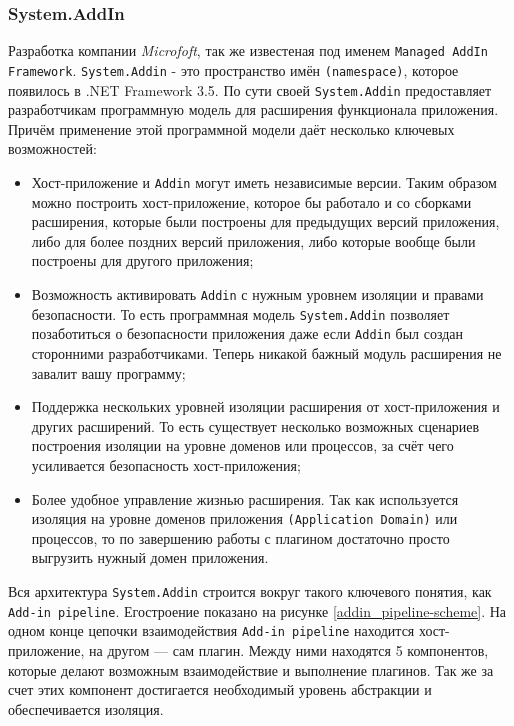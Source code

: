 \subsubsection{System.AddIn}

Разработка компании {\it Microfoft}, так же известеная под именем {\tt Managed AddIn Framework}. {\tt System.Addin} - это пространство имён {\tt(namespace)}, которое появилось в .NET Framework 3.5. По сути своей {\tt System.Addin} предоставляет разработчикам программную модель для расширения функционала приложения. Причём применение этой программной модели даёт несколько ключевых возможностей:

\begin{itemize}

  \item Хост-приложение и {\tt Addin} могут иметь независимые версии. Таким образом можно построить хост-приложение, которое бы работало и со сборками расширения, которые были построены для предыдущих версий приложения, либо для более поздних версий приложения, либо которые вообще были построены для другого приложения;

  \item Возможность активировать {\tt Addin} с нужным уровнем изоляции и правами безопасности. То есть программная модель {\tt System.Addin} позволяет позаботиться о безопасности приложения даже если {\tt Addin} был создан сторонними разработчиками. Теперь никакой бажный модуль расширения не завалит вашу программу;

  \item Поддержка нескольких уровней изоляции расширения от хост-приложения и других расширений. То есть существует несколько возможных сценариев построения изоляции на уровне доменов или процессов, за счёт чего усиливается безопасность хост-приложения;

  \item Более удобное управление жизнью расширения. Так как используется изоляция на уровне доменов приложения {\tt (Application Domain)} или процессов, то по завершению работы с плагином достаточно просто выгрузить нужный домен приложения.

\end{itemize}

Вся архитектура {\tt System.Addin} строится вокруг такого ключевого понятия, как {\tt Add-in pipeline}. Егостроение показано на рисунке \ref{addin_pipeline-scheme}. На одном конце цепочки взаимодействия {\tt Add-in pipeline} находится хост-приложение, на другом --- сам плагин. Между ними находятся 5 компонентов, которые делают возможным взаимодействие и выполнение плагинов. Так же за счет этих компонент достигается необходимый уровень абстракции и обеспечивается изоляция.

